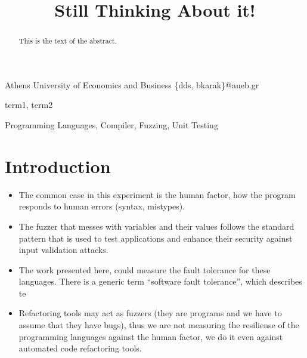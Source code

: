\documentclass[10pt]{sigplanconf}
\begin{document}
\copyrightdata{[to be supplied]}


\title{Still Thinking About it!}

           {Athens University of Economics and Business}
           {\{dds, bkarak\}@aueb.gr}

\maketitle

\begin{abstract}
This is the text of the abstract.
\end{abstract}


\terms
term1, term2

\keywords
Programming Languages, Compiler, Fuzzing, Unit Testing

\section{Introduction} %

\cite{C99}

\begin{itemize}
	\item The common case in this experiment is the human factor, how the program responds to human errors (syntax, mistypes).
	\item The fuzzer that messes with variables and their values follows the standard pattern that is used to test applications and enhance their security against input validation attacks.
	\item The work presented here, could measure the fault tolerance for these languages. There is a generic term ``software fault tolerance'', which describes te
	\item Refactoring tools may act as fuzzers (they are programs and we have to assume that they have bugs), thus we are not measuring the resiliense of the programming languages against the human factor, we do it even against automated code refactoring tools.
\end{itemize}
\end{document}

